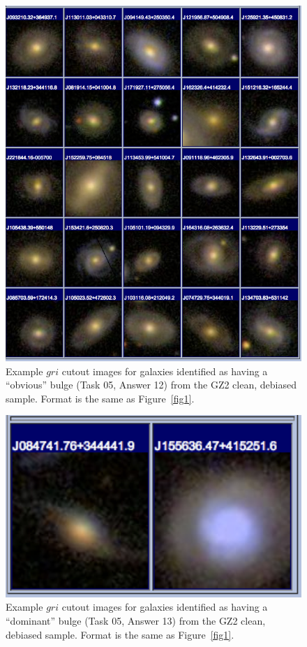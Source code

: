 \documentclass[useAMS,usenatbib]{mn2e}
\begin{document}
\newpage
\clearpage
\begin{figure}
\includegraphics[angle=0,width=7.0in]{figures/gallery/obvious.png}
\caption{Example $gri$ cutout images for galaxies identified as having a ``obvious'' bulge (Task 05, Answer 12) from the GZ2 clean, debiased sample. Format is the same as Figure~\ref{fig1}.}
\end{figure}

\newpage
\clearpage
\begin{figure}
\includegraphics[angle=0,width=7.0in]{figures/gallery/dominant.png}
\caption{Example $gri$ cutout images for galaxies identified as having a ``dominant'' bulge (Task 05, Answer 13) from the GZ2 clean, debiased sample. Format is the same as Figure~\ref{fig1}.}
\end{figure}
\end{document}
